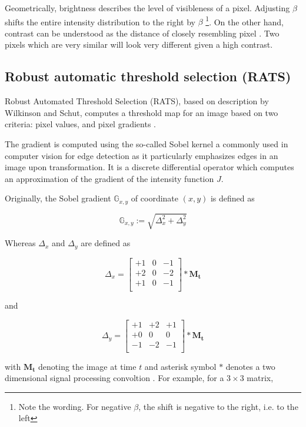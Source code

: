 \documentclass[pdftex,12pt,a4paper]{report}
\begin{document}
Geometrically, brightness describes the level of visibleness of a pixel. Adjusting $\beta$ shifts the entire intensity distribution to the right by $\beta$ \footnote{Note the wording. For negative $\beta$, the shift is negative to the right, i.e. to the left}. On the other hand, contrast can be understood as the distance of closely resembling pixel \cite{hartley2003multiple}. Two pixels which are very similar will look very different given a high contrast.

\subsection{Robust automatic threshold selection (RATS)}
\label{subsubsection:rats}

Robust Automated Threshold Selection (RATS), based on description by Wilkinson and Schut\cite{wilkinson1998digital}, computes a threshold map for an image based on two criteria: pixel values, and pixel gradients \cite{fiji2017rats}.

The gradient is computed using the so-called Sobel kernel \cite{sobel1990isotropic} a commonly used in computer vision for edge detection as it particularly emphasizes edges in an image upon transformation. It is a discrete differential operator which computes an approximation of the gradient of the intensity function $J$.

Originally, the Sobel gradient $\mathbb{G}_{x, y}$ of coordinate $(x, y)$ is defined as

$$
\mathbb{G}_{x, y} := \sqrt{\Delta_x^2 + \Delta_y^2}
$$

Whereas $\Delta_x$ and $\Delta_y$ are defined as

\[
\Delta_x = 
\begin{bmatrix}
+1 & 0 & -1 \\
+2 & 0 & -2 \\
+1 & 0 & -1 \\
\end{bmatrix}
*
\mathbf{M_t}
\]

and

\[
\Delta_y = 
\begin{bmatrix}
+1 & +2 & +1 \\
+0 & 0 & 0 \\
-1 & -2 & -1 \\
\end{bmatrix}
*
\mathbf{M_t}
\]

with $\mathbf{M_t}$ denoting the image at time $t$ and asterisk symbol $*$ denotes  a two dimensional signal processing convoltion \cite{smith1997scientist}. For example, for a $3 \times 3$ matrix,
\end{document}
